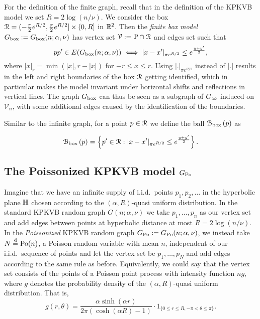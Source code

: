 For the definition of the finite graph, recall that in the definition of the KPKVB model we set $R = 2\log(n/\nu)$.
We consider the box ${\mathcal R} = (-\frac{\pi}{2}e^{R/2}, \frac{\pi}{2}e^{R/2}] \times (0, R]$ in ${\mathbb R}^2$. 
Then the \emph{finite box model} $G_{\text{box}} := G_{\text{box}}(n;\alpha, \nu)$ has vertex set $\mathcal{V} := \mathcal{P} \cap {\mathcal R}$ and edges set such that
\[
	pp' \in E(G_{\text{box}}(n;\alpha, \nu)) \iff |x - x'|_{\pi e^{R/2}} \leq e^{\frac{y + y'}{2}},
\]
where $|x|_{r} = \min( |x|, r - |x|)$ for $-r\leq x\leq r$. 
Using $|.|_{\pi e^{R/2}}$ instead of $|.|$ results in the left and right boundaries of the box ${\mathcal R}$ getting 
identified, which in particular 
makes the model invariant under horizontal shifts and reflections in vertical lines. 
The graph $G_{\text{box}}$ can thus be seen as a subgraph of $G_{\infty}$ induced on $\mathcal{V}_n$, with some additional edges caused by 
the identification of the boundaries.

Similar to the infinite graph, for a point $p \in {\mathcal R}$ we define the ball ${\mathcal B}_{\text{box}}\left(p\right)$ as

\begin{equation}\label{eq:def_ball_P_n}
	{\mathcal B}_{\text{box}}\left(p\right) = 
	\left\{p' \in {\mathcal R} : |x - x'|_{\pi e^{R/2}} \leq e^{\frac{y + y'}{2}}\right\}.
\end{equation}


\subsection{The Poissonized KPKVB model $G_{\text{Po}}$}


Imagine that we have an infinite supply of i.i.d.~points $p_1, p_2, \dots$ in the hyperbolic plane ${\mathbb H}$ chosen according to the $(\alpha, R)$-quasi uniform distribution. In the standard KPKVB random graph $G(n;\alpha,\nu)$ we take $p_1,\dots, p_n$ as our vertex set and add edges between points at hyperbolic distance at most $R = 2\log(n/\nu)$. In the {\em Poissonized} KPKVB random graph $G_{\text{Po}} := G_{\text{Po}}(n;\alpha,\nu)$, we instead take $N\stackrel{\text{d}}{=} {\mathrm{Po}}(n)$, a Poisson random variable 
with mean $n$, independent of our i.i.d.~sequence of points and let the vertex set be $p_1,\dots, p_N$ and add edges 
according to the same rule as before. Equivalently, we could say that the vertex set consists of the points of a Poisson point process with intensity function $n g$, where $g$ denotes the probability density of the $(\alpha,R)$-quasi uniform distribution. That is,
\[
	g(r,\theta) = \frac{\alpha\sinh(\alpha r)}{2\pi(\cosh(\alpha R) - 1)} \cdot 1_{\{0\leq r\leq R, -\pi<\theta\leq \pi\}}.
\] 

